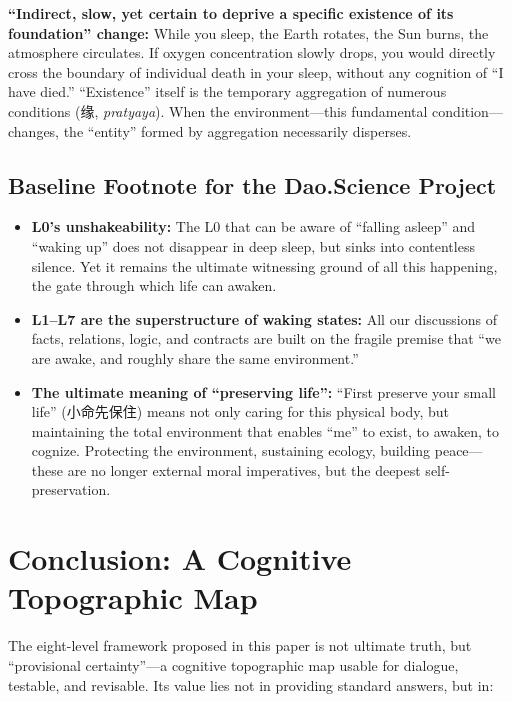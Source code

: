 \documentclass[11pt,a4paper]{article}
\begin{document}
\textbf{``Indirect, slow, yet certain to deprive a specific existence of its foundation'' change:} While you sleep, the Earth rotates, the Sun burns, the atmosphere circulates. If oxygen concentration slowly drops, you would directly cross the boundary of individual death in your sleep, without any cognition of ``I have died.'' ``Existence'' itself is the temporary aggregation of numerous conditions (缘, \textit{pratyaya}). When the environment---this fundamental condition---changes, the ``entity'' formed by aggregation necessarily disperses.

\subsection{Baseline Footnote for the Dao.Science Project}

\begin{itemize}[nosep]
    \item \textbf{L0's unshakeability:} The L0 that can be aware of ``falling asleep'' and ``waking up'' does not disappear in deep sleep, but sinks into contentless silence. Yet it remains the ultimate witnessing ground of all this happening, the gate through which life can awaken.
    \item \textbf{L1--L7 are the superstructure of waking states:} All our discussions of facts, relations, logic, and contracts are built on the fragile premise that ``we are awake, and roughly share the same environment.''
    \item \textbf{The ultimate meaning of ``preserving life'':} ``First preserve your small life'' (小命先保住) means not only caring for this physical body, but maintaining the total environment that enables ``me'' to exist, to awaken, to cognize. Protecting the environment, sustaining ecology, building peace---these are no longer external moral imperatives, but the deepest self-preservation.
\end{itemize}

\section{Conclusion: A Cognitive Topographic Map}

The eight-level framework proposed in this paper is not ultimate truth, but ``provisional certainty''---a cognitive topographic map usable for dialogue, testable, and revisable. Its value lies not in providing standard answers, but in:
\end{document}
